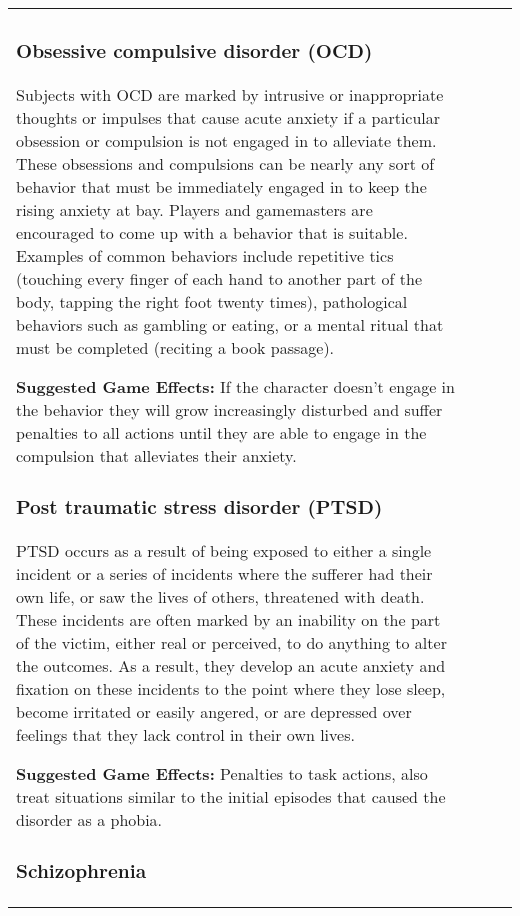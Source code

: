 \begin{table}
\begin{tabular}{|p{8cm}|r|r|r|}
\subsubsection{Obsessive compulsive disorder (OCD)} 

Subjects with OCD are marked by intrusive or inappropriate thoughts or impulses that cause acute anxiety if a particular obsession or compulsion is not engaged in to alleviate them. These obsessions and compulsions can be nearly any sort of behavior that must be immediately engaged in to keep the rising anxiety at bay. Players and gamemasters are encouraged to come up with a behavior that is suitable. Examples of common behaviors include repetitive tics (touching every finger of each hand to another part of the body, tapping the right foot twenty times), pathological behaviors such as gambling or eating, or a mental ritual that must be completed (reciting a book passage). 

\textbf{Suggested Game Effects:} If the character doesn’t engage in the behavior they will grow increasingly disturbed and suffer penalties to all actions until they are able to engage in the compulsion that alleviates their anxiety. 

\subsubsection{Post traumatic stress disorder (PTSD)} 

PTSD occurs as a result of being exposed to either a single incident or a series of incidents where the sufferer had their own life, or saw the lives of others, threatened with death. These incidents are often marked by an inability on the part of the victim, either real or perceived, to do anything to alter the outcomes. As a result, they develop an acute anxiety and fixation on these incidents to the point where they lose sleep, become irritated or easily angered, or are depressed over feelings that they lack control in their own lives. 

\textbf{Suggested Game Effects:} Penalties to task actions, also treat situations similar to the initial episodes that caused the disorder as a phobia. 

\subsubsection{Schizophrenia} 


\end{tabular}
\end{table}
